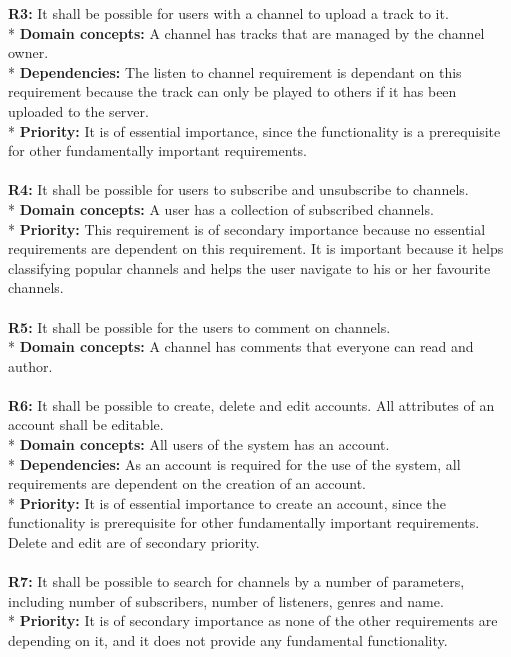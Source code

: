 \documentclass[a4paper,11pt,report]{article}
\begin{document}
\textbf{R3:}
It shall be possible for users with a channel to upload a track to it. \\*
\textbf{Domain concepts:}
A channel has tracks that are managed by the channel owner. \\*
\textbf{Dependencies:}
The listen to channel requirement is dependant on this requirement because the track can only be played to others if it has been uploaded to the server.\\*
\textbf{Priority:}
It is of essential importance, since the functionality is a prerequisite for other fundamentally important requirements.
\\ \\

\textbf{R4:}
It shall be possible for users to subscribe and unsubscribe to channels. \\*
\textbf{Domain concepts:}
A user has a collection of subscribed channels. \\*
\textbf{Priority:}
This requirement is of secondary importance because no essential requirements are dependent on this requirement. It is important because it helps classifying popular channels and helps the user navigate to his or her favourite channels.
\\ \\

\textbf{R5:}
It shall be possible for the users to comment on channels. \\*
\textbf{Domain concepts:}
A channel has comments that everyone can read and author.
\\ \\

\textbf{R6:}
It shall be possible to create, delete and edit accounts. All attributes of an account shall be editable. \\*
\textbf{Domain concepts:}
All users of the system has an account. \\*
\textbf{Dependencies:}
As an account is required for the use of the system, all requirements are dependent on the creation of an account. \\*
\textbf{Priority:} 
It is of essential importance to create an account, since the functionality is prerequisite for other fundamentally important requirements. Delete and edit are of secondary priority.
\\ \\

\textbf{R7:}
It shall be possible to search for channels by a number of parameters, including number of subscribers, number of listeners, genres and name. \\*
\textbf{Priority:} 
It is of secondary importance as none of the other requirements are depending on it, and it does not provide any fundamental functionality.
\end{document}
